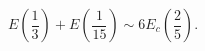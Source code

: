 \begin{equation}
E\left(\frac{1}{3}\right)+E\left(\frac{1}{15}\right)
\sim 6 E_{c}\left(\frac{2}{5}\right).
\end{equation}

